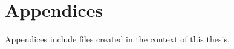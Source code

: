 \documentclass[11pt,a4paper,twoside,openright]{report}
\let\openright=\cleardoublepage
\begin{document}


\setcounter{tocdepth}{2}
\tableofcontents

\openright
\listoffigures

\clearpage
\lstlistoflistings




\pagestyle{fancy}











% 
% 




\chapter*{Appendices}

Appendices include files created in the context of this thesis.



\end{document}
